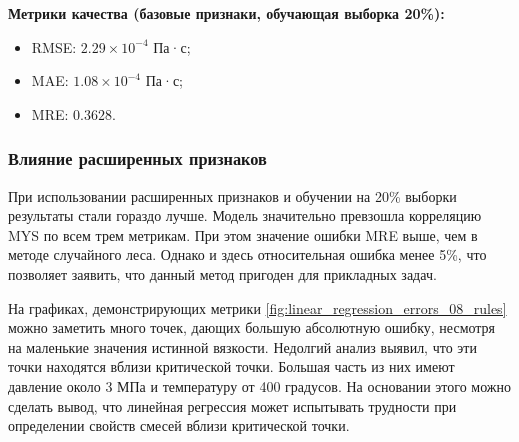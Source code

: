 \documentclass[a4paper,12pt]{article}
\begin{document}
    \vspace{5mm}
    \begin{minipage}{\textwidth}
    \textbf{Метрики качества (базовые признаки, обучающая выборка 20\%):}
      \begin{itemize}
          \item RMSE: \( 2.29 \times 10^{-4} \) Па·с;
          \item MAE: \( 1.08 \times 10^{-4} \) Па·с;
          \item MRE: \( 0.3628 \).
      \end{itemize}
    \end{minipage}
    
    \subsubsection{Влияние расширенных признаков}
    
    При использовании расширенных признаков и обучении на 20\% выборки результаты стали гораздо лучше. Модель значительно превзошла корреляцию MYS по всем трем метрикам. При этом значение ошибки MRE выше, чем в методе случайного леса. Однако и здесь относительная ошибка менее 5\%, что позволяет заявить, что данный метод пригоден для прикладных задач. 

    На графиках, демонстрирующих метрики \autoref{fig:linear_regression_errors_08_rules} можно заметить много точек, дающих большую абсолютную ошибку, несмотря на маленькие значения истинной вязкости. Недолгий анализ выявил, что эти точки находятся вблизи критической точки. Большая часть из них имеют давление около 3 МПа и температуру от 400 градусов. На основании этого можно сделать вывод, что линейная регрессия может испытывать трудности при определении свойств смесей вблизи критической точки. 
    
\end{document}
